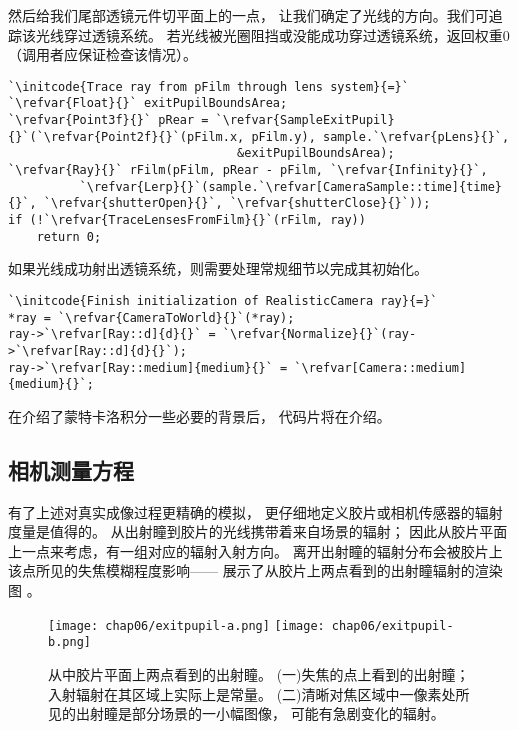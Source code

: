然后给我们尾部透镜元件切平面上的一点，
让我们确定了光线的方向。我们可追踪该光线穿过透镜系统。
若光线被光圈阻挡或没能成功穿过透镜系统，返回权重0
（调用者应保证检查该情况）。
\begin{lstlisting}
`\initcode{Trace ray from pFilm through lens system}{=}`
`\refvar{Float}{}` exitPupilBoundsArea;
`\refvar{Point3f}{}` pRear = `\refvar{SampleExitPupil}{}`(`\refvar{Point2f}{}`(pFilm.x, pFilm.y), sample.`\refvar{pLens}{}`,
                                &exitPupilBoundsArea);
`\refvar{Ray}{}` rFilm(pFilm, pRear - pFilm, `\refvar{Infinity}{}`,
          `\refvar{Lerp}{}`(sample.`\refvar[CameraSample::time]{time}{}`, `\refvar{shutterOpen}{}`, `\refvar{shutterClose}{}`));
if (!`\refvar{TraceLensesFromFilm}{}`(rFilm, ray))
    return 0;
\end{lstlisting}

如果光线成功射出透镜系统，则需要处理常规细节以完成其初始化。
\begin{lstlisting}
`\initcode{Finish initialization of RealisticCamera ray}{=}`
*ray = `\refvar{CameraToWorld}{}`(*ray);
ray->`\refvar[Ray::d]{d}{}` = `\refvar{Normalize}{}`(ray->`\refvar[Ray::d]{d}{}`);
ray->`\refvar[Ray::medium]{medium}{}` = `\refvar[Camera::medium]{medium}{}`;
\end{lstlisting}

在介绍了蒙特卡洛积分一些必要的背景后，
代码片将在介绍。

\subsection{相机测量方程}\label{sub:相机测量方程}
有了上述对真实成像过程更精确的模拟，
更仔细地定义胶片或相机传感器的辐射度量是值得的。
从出射瞳到胶片的光线携带着来自场景的辐射；
因此从胶片平面上一点来考虑，有一组对应的辐射入射方向。
离开出射瞳的辐射分布会被胶片上该点所见的失焦模糊程度影响——
展示了从胶片上两点看到的出射瞳辐射的渲染图
。
\begin{figure}[htbp]
    \centering
    \texttt{[image: chap06/exitpupil-a.png]}\quad
    \texttt{[image: chap06/exitpupil-b.png]}
    \caption{从中胶片平面上两点看到的出射瞳。
        (一)失焦的点上看到的出射瞳；入射辐射在其区域上实际上是常量。
        (二)清晰对焦区域中一像素处所见的出射瞳是部分场景的一小幅图像，
        可能有急剧变化的辐射。}
    \label{fig:6.24}
\end{figure}

